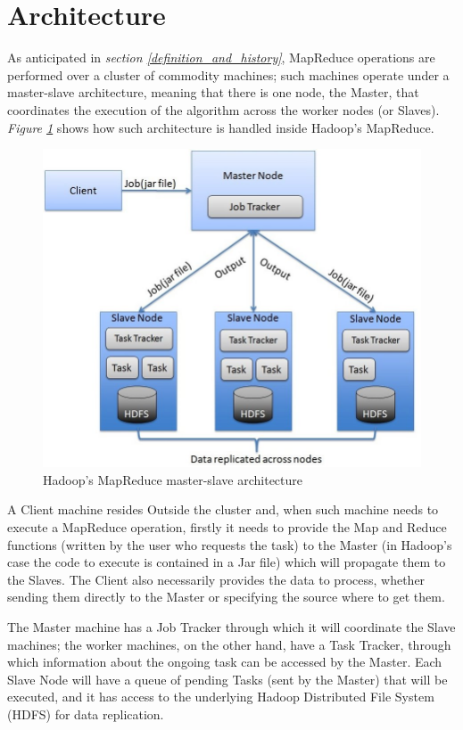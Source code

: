 \section{Architecture}\label{map_reduce_architecture}
As anticipated in \textit{section \ref{definition_and_history}}, MapReduce operations are performed over a cluster of commodity machines; such machines operate under a master-slave architecture, meaning that there is one node, the Master, that coordinates the execution of the algorithm across the worker nodes (or Slaves). \textit{Figure \ref{fig:hadoop_master_slave_architecture}} shows how such architecture is handled inside Hadoop's MapReduce.

\begin{figure}[H]
    \centering
    \includegraphics[scale=0.45]{document/chapters/chapter_4/images/hadoop_master_slave_architecture.png}
    \caption{Hadoop's MapReduce master-slave architecture\cite{hadoop_map_reduce}}
    \label{fig:hadoop_master_slave_architecture}
\end{figure}

A Client machine resides Outside the cluster and, when such machine needs to execute a MapReduce operation, firstly it needs to provide the Map and Reduce functions (written by the user who requests the task) to the Master (in Hadoop's case the code to execute is contained in a Jar file) which will propagate them to the Slaves. The Client also necessarily provides the data to process, whether sending them directly to the Master or specifying the source where to get them.

The Master machine has a Job Tracker through which it will coordinate the Slave machines; the worker machines, on the other hand, have a Task Tracker, through which information about the ongoing task can be accessed by the Master. Each Slave Node will have a queue of pending Tasks (sent by the Master) that will be executed, and it has access to the underlying Hadoop Distributed File System (HDFS) for data replication.
